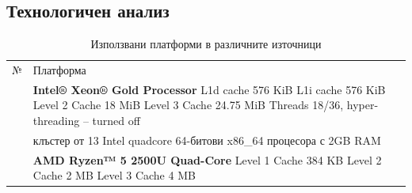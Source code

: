 \documentclass[a4paper,11pt]{article}
\begin{document}
\subsection{Технологичен анализ}
\begin{table}[H]
    \centering
    \begin{tabularx}{\linewidth}{|c|X|}
        \hline
        \multirow{2}{*}{№} & \multirow{2}{*}{Платформа} \\
        & \\
        \hline
        [2] & \textbf{Intel® Xeon® Gold Processor}\newline
        L1d cache 576 KiB\newline
        L1i cache 576 KiB\newline
        Level 2 Cache 18 MiB\newline
        Level 3 Cache 24.75 MiB\newline
        Threads 18/36, hyper-threading – turned off\\
        \hline
        [3] & клъстер от 13 Intel quadcore 64-битови x86\_64 процесора с 2GB RAM\\
        \hline
        [4] & \textbf{AMD Ryzen™ 5 2500U Quad-Core}\newline
        Level 1 Cache 384 KB\newline
        Level 2 Cache 2 MB\newline
        Level 3 Cache 4 MB\\
        \hline
    \end{tabularx}
    \caption{Използвани платформи в различните източници}
    \label{tab:platforms}
\end{table}
\end{document}

